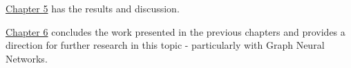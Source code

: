 \hyperref[Chapter5]{Chapter 5} has the results and discussion. 

\hyperref[Chapter6]{Chapter 6}  concludes the work presented in the previous chapters and provides a direction for further research in this topic - particularly with Graph Neural Networks.








